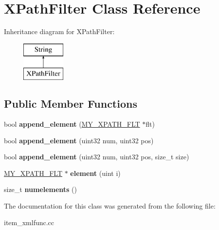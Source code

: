 \hypertarget{classXPathFilter}{}\section{X\+Path\+Filter Class Reference}
\label{classXPathFilter}
Inheritance diagram for X\+Path\+Filter\+:\begin{figure}[H]
\begin{center}
\leavevmode
\includegraphics[height=2.000000cm]{classXPathFilter}
\end{center}
\end{figure}
\subsection*{Public Member Functions}
\begin{DoxyCompactItemize}
\item 
\mbox{\label{classXPathFilter_a2dbd746c00bcc83058429220cb96154d}} 
bool {\bfseries append\+\_\+element} (\mbox{\hyperlink{structmy__xpath__flt__st}{M\+Y\+\_\+\+X\+P\+A\+T\+H\+\_\+\+F\+LT}} $\ast$flt)
\item 
\mbox{\label{classXPathFilter_a7b610aa4624d1259a5a1afe5f61da3bb}} 
bool {\bfseries append\+\_\+element} (uint32 num, uint32 pos)
\item 
\mbox{\label{classXPathFilter_a1c4493c5064dc770dc81324ca3f07747}} 
bool {\bfseries append\+\_\+element} (uint32 num, uint32 pos, size\+\_\+t size)
\item 
\mbox{\label{classXPathFilter_ae81f6a8daefa26922b82a598b6a1c0e3}} 
\mbox{\hyperlink{structmy__xpath__flt__st}{M\+Y\+\_\+\+X\+P\+A\+T\+H\+\_\+\+F\+LT}} $\ast$ {\bfseries element} (uint i)
\item 
\mbox{\label{classXPathFilter_a89cd081717c53679f024dd720176e730}} 
size\+\_\+t {\bfseries numelements} ()
\end{DoxyCompactItemize}


The documentation for this class was generated from the following file\+:\begin{DoxyCompactItemize}
\item 
item\+\_\+xmlfunc.\+cc\end{DoxyCompactItemize}
